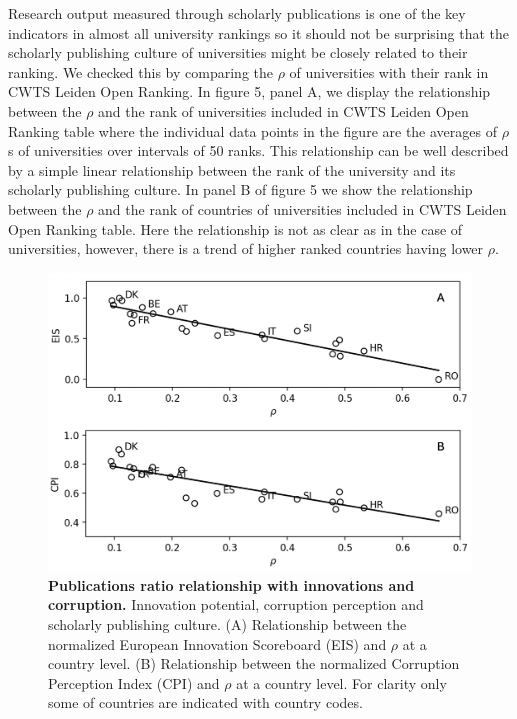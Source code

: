 \documentclass[amsfonts, amssymb, prl, superscriptaddress, notitlepage, twocolumn, nofootinbib]{revtex4-2}
\begin{document}
Research output measured through scholarly publications is one of the key indicators in almost all university rankings so it should not be surprising that the scholarly publishing culture of universities might be closely related to their ranking. We checked this by comparing the $\rho$ of universities with their rank in CWTS Leiden Open Ranking. In figure 5, panel A, we display the relationship between the $\rho$ and the rank of universities included in CWTS Leiden Open Ranking table where the individual data points in the figure are the averages of $\rho$s of universities over intervals of 50 ranks. This relationship can be well described by a simple linear relationship between the rank of the university and its scholarly publishing culture. In panel B of figure 5 we show the relationship between the $\rho$ and the rank of countries of universities included in CWTS Leiden Open Ranking table. Here the relationship is not as clear as in the case of universities, however, there is a trend of higher ranked countries having lower $\rho$.

\begin{figure}
    \centering
    \includegraphics[width=1.0\linewidth]{Fig04f.png}
    \caption{\label{fig:fig6} {\bf Publications ratio relationship with innovations and corruption.} Innovation potential, corruption perception and scholarly publishing culture. (A) Relationship between the normalized European Innovation Scoreboard (EIS) and $\rho$ at a country level. (B) Relationship between the normalized Corruption Perception Index (CPI) and $\rho$ at a country level. For clarity only some of countries are indicated with country codes.
}
\end{figure}
\end{document}
